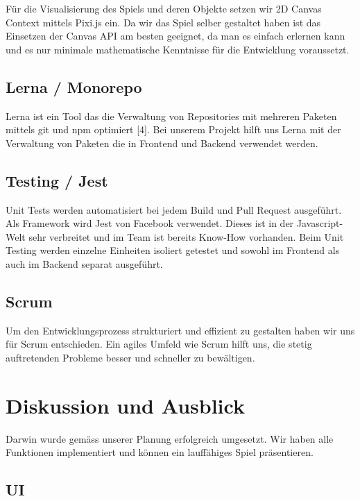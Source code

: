 \documentclass[11pt,a4paper,titlepage]{article}
\begin{document}
Für die Visualisierung des Spiels und deren Objekte setzen wir 2D Canvas Context mittels Pixi.js ein. Da wir das Spiel selber gestaltet haben ist das Einsetzen der Canvas API am besten geeignet, da man es einfach erlernen kann und es nur minimale mathematische Kenntnisse für die Entwicklung voraussetzt.

\subsection{Lerna / Monorepo}
Lerna ist ein Tool das die Verwaltung von Repositories mit mehreren Paketen mittels git und npm optimiert [4]. Bei unserem Projekt hilft uns Lerna mit der Verwaltung von Paketen die in Frontend und Backend verwendet werden.

\subsection{Testing / Jest}
Unit Tests werden automatisiert bei jedem Build und Pull Request ausgeführt.
Als Framework wird Jest von Facebook verwendet. Dieses ist in der Javascript-Welt sehr verbreitet und im Team ist bereits Know-How vorhanden.
Beim Unit Testing werden einzelne Einheiten isoliert getestet und sowohl im Frontend als auch im Backend separat ausgeführt.

\subsection{Scrum}
Um den Entwicklungsprozess strukturiert und effizient zu gestalten haben wir uns für Scrum entschieden. Ein agiles Umfeld wie Scrum hilft uns, die stetig auftretenden Probleme besser und schneller zu bewältigen.

\section{Diskussion und Ausblick}
%

Darwin wurde gemäss unserer Planung erfolgreich umgesetzt. Wir haben alle Funktionen implementiert und können ein lauffähiges Spiel präsentieren.

\subsection{UI}
\end{document}
